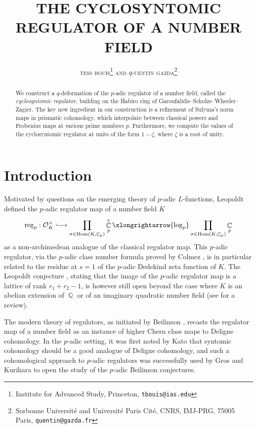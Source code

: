 \documentclass[10pt,twoside]{scrarticle}
\title{\uppercase{\textbf{\large{The cyclosyntomic regulator of a number field}}}}
\author{\textsc{tess bouis}\thanks{Institute for Advanced Study, Princeton, \texttt{tbouis@ias.edu}} \textsc{ and} $q$-\textsc{uentin gazda}\footnote{Sorbonne Université and Université Paris Cité, CNRS, IMJ-PRG, 75005 Paris, \texttt{quentin@gazda.fr}}}
\date{}
\newlength{\mar} \setlength{\mar}{1cm}%
\newlength{\len}
\theoremstyle{definition}
\DeclareMathOperator{\Q}{\mathbb{Q}}
\DeclareMathOperator{\C}{\mathbb{C}}
\newcommand{\Hom}{\operatorname{Hom}}
\newcommand{\reg}{\mathrm{reg}}
\numberwithin{equation}{theorem}
\begin{document}
	
	\pagestyle{fancy}
	\fancyfoot[C]{\thepage}

    \maketitle

    \vspace{-3em}
	
	\begin{abstract}
        We construct a $q$-deformation of the $p$-adic regulator of a number field, called the \emph{cyclosyntomic regulator}, building on the Habiro ring of Garoufalidis--Scholze--Wheeler--Zagier. The key new ingredient in our construction is a refinement of Sulyma's norm maps in prismatic cohomology, which interpolate between classical powers and Frobenius maps at various prime numbers $p$. Furthermore, we compute the values of the cyclosyntomic regulator at units of the form $1-\zeta$, where $\zeta$ is a root of unity.
	\end{abstract}
	
	
	{
		\hypersetup{linkcolor=black}
		\tableofcontents
	}

    \section{Introduction}

    Motivated by questions on the emerging theory of $p$-adic $L$-functions, 
    Leopoldt \cite{leopoldt_arithmetik_1962} defined the $p$-adic regulator map of a number field $K$
    $$\reg_p : \mathcal{O}_K^\times \lhook\joinrel\longrightarrow  \prod_{\sigma \in \Hom(K,\C_p)} \C_p^{\times} \xlongrightarrow{\log_p} \prod_{\sigma \in \Hom(K,\C_p)} \C_p$$
    as a non-archimedean analogue of the classical regulator map. This $p$-adic regulator, via the $p$-adic class number formula proved by Colmez \cite{colmez_residu_1988}, is in particular related to the residue at $s=1$ of the $p$-adic Dedekind zeta function of $K$. The Leopoldt conjecture \cite{leopoldt_arithmetik_1962,leopoldt_p-adische_1975}, stating that the image of the $p$-adic regulator map is a lattice of rank $r_1 + r_2 - 1$, is however still open beyond the case where $K$ is an abelian extension of $\Q$ or of an imaginary quadratic number field (see \cite[Chapter~X.3]{meukirch_cohomology_2008} for a review). 

    The modern theory of regulators, as initiated by Beilinson \cite{beilinson_higher_1984}, recasts the regulator map of a number field as an instance of higher Chern class maps to Deligne cohomology. In the $p$\nobreakdash-adic setting, it was first noted by Kato \cite[Remark~$3.5$]{kato_p-adic_1987} that syntomic cohomology should be a good analogue of Deligne cohomology, and such a cohomological approach to $p$-adic regulators was successfully used by Gros and Kurihara \cite{gros_regulateurs_1990,gros_regulateurs_1994} to open the study of the $p$-adic Beilinson conjectures. 
\end{document}
